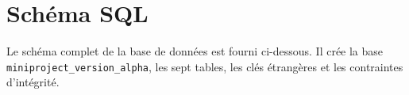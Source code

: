 \section{Schéma SQL}

Le schéma complet de la base de données est fourni ci-dessous. Il crée la base \texttt{miniproject\_version\_alpha}, les sept tables, les clés étrangères et les contraintes d'intégrité.

\begingroup
\lstset{basicstyle=\ttfamily\scriptsize,numbers=none}

\endgroup


